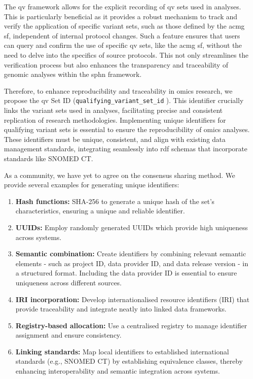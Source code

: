 The \ac{qv} framework allows for the explicit recording of \ac{qv} sets used in analyses. 
This is particularly beneficial as it provides a robust mechanism to track and verify the application of specific variant sets, such as those defined by the \ac{acmg} \ac{sf}, independent of internal protocol changes. 
Such a feature ensures that users can query and confirm the use of specific \ac{qv} sets, like the \ac{acmg} \ac{sf}, without the need to delve into the specifics of source protocols. 
This not only streamlines the verification process but also enhances the transparency and traceability of genomic analyses within the \ac{sphn} framework.

Therefore, to enhance reproducibility and traceability in omics research, we propose the \ac{qv} Set ID (\texttt{qualifying\_variant\_set\_id} ). This identifier crucially links the variant sets used in analyses, facilitating precise and consistent replication of research methodologies.
Implementing unique identifiers for qualifying variant sets is essential to ensure the reproducibility of omics analyses. These identifiers must be unique, consistent, and align with existing data management standards, integrating seamlessly into \ac{rdf} schemas that incorporate standards like SNOMED CT.

As a community, we have yet to agree on the consensus sharing method. 
We provide several examples for generating unique identifiers:

\begin{enumerate}
    \item \textbf{Hash functions:} SHA-256 to generate a unique hash of the set's characteristics, ensuring a unique and reliable identifier.
    \item \textbf{UUIDs:} Employ randomly generated UUIDs which provide high uniqueness across systems.
   \item \textbf{Semantic combination:} Create identifiers by combining relevant semantic elements - such as project ID, data provider ID, and data release version - in a structured format. Including the data provider ID is essential to ensure uniqueness across different sources.
    \item \textbf{IRI incorporation:} Develop internationalised resource identifiers (IRI) that provide traceability and integrate neatly into linked data frameworks.
    \item \textbf{Registry-based allocation:} Use a centralised registry to manage identifier assignment and ensure consistency.
    \item \textbf{Linking standards:} Map local identifiers to established international standards (e.g., SNOMED CT) by establishing equivalence classes, thereby enhancing interoperability and semantic integration across systems.
\end{enumerate}

